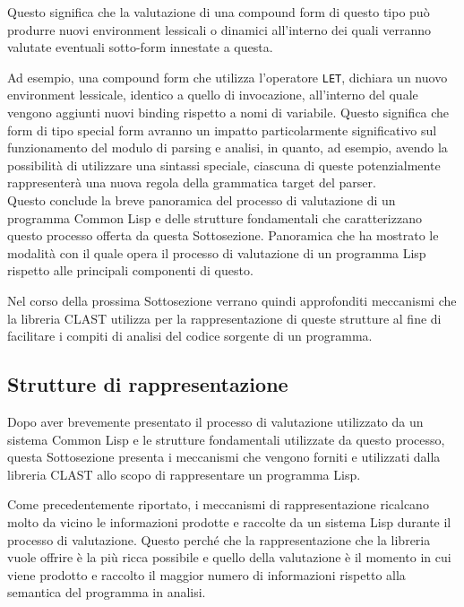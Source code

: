 Questo significa che la valutazione di una compound form di questo tipo può
produrre nuovi environment lessicali o dinamici all’interno dei quali verranno
valutate eventuali sotto-form innestate a questa.

Ad esempio, una compound form che utilizza l’operatore \texttt{LET}, dichiara
un nuovo environment lessicale, identico a quello di invocazione, all’interno
del quale vengono aggiunti nuovi binding rispetto a nomi di variabile. Questo
significa che form di tipo special form avranno un impatto particolarmente
significativo sul funzionamento del modulo di parsing e analisi, in quanto, ad
esempio, avendo la possibilità di utilizzare una sintassi speciale, ciascuna
di queste potenzialmente rappresenterà una nuova regola della grammatica
target del parser.\\

Questo conclude la breve panoramica del processo di valutazione di un
programma Common Lisp e delle strutture fondamentali che caratterizzano questo
processo offerta da questa Sottosezione. Panoramica che ha mostrato le
modalità con il quale opera il processo di valutazione di un programma Lisp
rispetto alle principali componenti di questo.

Nel corso della prossima Sottosezione verrano quindi approfonditi meccanismi che
la libreria CLAST utilizza per la rappresentazione di queste strutture al fine
di facilitare i compiti di analisi del codice sorgente di un programma.

\subsection{Strutture di rappresentazione}

Dopo aver brevemente presentato il processo di valutazione utilizzato da un
sistema Common Lisp e le strutture fondamentali utilizzate da questo processo,
questa Sottosezione presenta i meccanismi che vengono forniti e utilizzati
dalla libreria CLAST allo scopo di rappresentare un programma Lisp.

Come precedentemente riportato, i meccanismi di rappresentazione ricalcano
molto da vicino le informazioni prodotte e raccolte da un sistema Lisp durante
il processo di valutazione. Questo perché che la rappresentazione che la
libreria vuole offrire è la più ricca possibile e quello della valutazione è
il momento in cui viene prodotto e raccolto il maggior numero di informazioni
rispetto alla semantica del programma in analisi.\\

